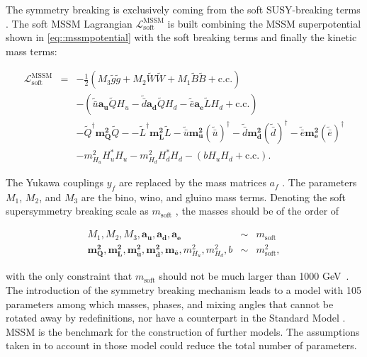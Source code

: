 The symmetry breaking is exclusively coming from the soft SUSY-breaking terms \cite{Martin:1997ns}. The soft MSSM Lagrangian $\mathcal{L}_{\mathrm{soft}}^{\mathrm{MSSM}}$ is built combining the MSSM superpotential shown in \autoref{eq::mssmpotential} with the soft breaking terms and finally the kinetic mass terms\cite{Martin:1997ns}:

\begin{eqnarray}
\mathcal{L}_{\mathrm{soft}}^{\mathrm{MSSM}} &=& -\frac{1}{2}\left(M_3\widetilde{g}\widetilde{g} + M_2 \widetilde{W}\widetilde{W} + M_1\widetilde{B}\widetilde{B} + \mathrm{c.c.}\right)\nonumber\\
& & -\left(\widetilde{\bar{u}}\mathbf{a_u}\widetilde{Q}H_u - \widetilde{\bar{d}}\mathbf{a_d}\widetilde{Q}H_d  - \widetilde{\bar{e}}\mathbf{a_e}\widetilde{L}H_d + \mathrm{c.c.}\right)\nonumber\\
& & -\widetilde{Q}^\dag\mathbf{m_Q^2}\widetilde{Q} - -\widetilde{L}^\dag\mathbf{m_L^2}\widetilde{L} - \widetilde{\bar{u}}\mathbf{m_u^2}(\widetilde{\bar{u}})^\dag - \widetilde{\bar{d}}\mathbf{m_d^2}(\widetilde{\bar{d}})^\dag - \widetilde{\bar{e}}\mathbf{m_e^2}(\widetilde{\bar{e}})^\dag\nonumber\\
& & - m_{H_u}^2H_u^*H_u - m_{H_d}^2H_d^*H_d -(bH_uH_d + \mathrm{c.c.}).
\label{eqn:lmssm_soft}
\end{eqnarray}

The Yukawa couplings $y_{f}$ are replaced by the mass matrices $a_{f}$ \cite{Martin:1997ns}. The parameters $M_1$, $M_2$, and $M_3$ are the bino, wino, and gluino mass terms. Denoting the soft supersymmetry breaking scale as $m_{\mathrm{soft}}$ \cite{Martin:1997ns}, the masses should be of the order of

\begin{eqnarray}
M_1, M_2, M_3, \mathbf{a_u}, \mathbf{a_d}, \mathbf{a_e} &\sim& m_{\mathrm{soft}}\nonumber\\
\mathbf{m_Q^2}, \mathbf{m_L^2}, \mathbf{m_{\bar{u}}^2}, \mathbf{m_{\bar{d}}^2}, \mathbf{m_{\bar{e}}}, m_{H_u}^2, m_{H_d}^2, b &\sim& m_{\mathrm{soft}}^2,
\label{eqn:massscalesmssm}
\end{eqnarray}

with the only constraint that $m_{\mathrm{soft}}$ should not be much larger than 1000 GeV~\cite{Martin:1997ns}. The introduction of the symmetry breaking mechanism leads to a model with 105 parameters among which masses, phases, and mixing angles that cannot be rotated away by redefinitions, nor have a counterpart in the Standard Model \cite{Dimopoulos:1995ju}. MSSM is the benchmark for the construction of further models. The assumptions taken in to account in those model could reduce the total number of parameters.

